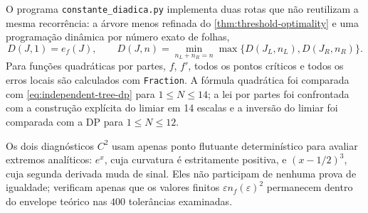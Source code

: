 \documentclass[11pt,a4paper]{article}
\theoremstyle{definition}
\theoremstyle{remark}
\begin{document}
O programa \texttt{constante\_diadica.py} implementa duas rotas que não
reutilizam a mesma recorrência: a árvore menos refinada do
\cref{thm:threshold-optimality} e uma programação dinâmica por número exato
de folhas,
\begin{equation}
 D(J,1)=e_f(J),\qquad
 D(J,n)=\min_{n_L+n_R=n}\max\{D(J_L,n_L),D(J_R,n_R)\}.
 \label{eq:independent-tree-dp}
\end{equation}
Para funções quadráticas por partes, $f$, $f'$, todos os pontos críticos e
todos os erros locais são calculados com \texttt{Fraction}. A fórmula
quadrática foi comparada com \eqref{eq:independent-tree-dp} para
$1\le N\le14$; a lei por partes foi confrontada com a construção explícita
do limiar em 14 escalas e a inversão do limiar foi comparada com a DP para
$1\le N\le12$.

Os dois diagnósticos $C^2$ usam apenas ponto flutuante determinístico para
avaliar extremos analíticos: $e^x$, cuja curvatura é estritamente positiva,
e $(x-1/2)^3$, cuja segunda derivada muda de sinal. Eles não participam de
nenhuma prova de igualdade; verificam apenas que os valores finitos
$\varepsilon n_f(\varepsilon)^2$ permanecem dentro do envelope teórico nas
$400$ tolerâncias examinadas.
\end{document}
